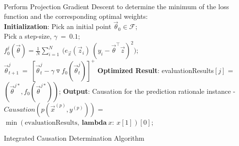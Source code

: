 \documentclass{article}
\begin{document}
\begin{algorithm}[H]
{
    Perform Projection Gradient Descent to determine the minimum of the loss function and the corresponding optimal weights:\\
    {
        \textbf{Initialization}: Pick an initial point $\vec{\theta}_0 \in \mathcal{F}$;
        \\Pick a step-size, $\gamma\ =\ 0.1$;\\
        $f_0^{j}(\vec{\theta}) = \frac{1}{N} \sum_{i=1}^N\ \Big(e_{\vec{x}}(\vec{z}_i)\ (y_i - \vec{\theta}^\intercal \vec{z})^2\Big)$;\\
        {
            $\vec{\theta}^{j}_{t+1}\ =\ [\vec{\theta}^{j}_t - \gamma \triangledown f_0(\vec{\theta}^{j}_t)]^+$\;
        }
        \textbf{Optimized Result}: evaluationResults$[j]$ = $(\vec{\theta}^{j*}, f_0(\vec{\theta}^{j*}))$;
    }
}
\textbf{Output}: Causation for the prediction rationale instance - \\ $Causation(p(\vec{x}^{(p)}, y^{(p)}))$ = $\min(\text{evaluationResults},\ \textbf{lambda}\ x:\ x[1])[0]$;
\caption{Integrated Causation Determination Algorithm}
\end{algorithm}
\end{document}
